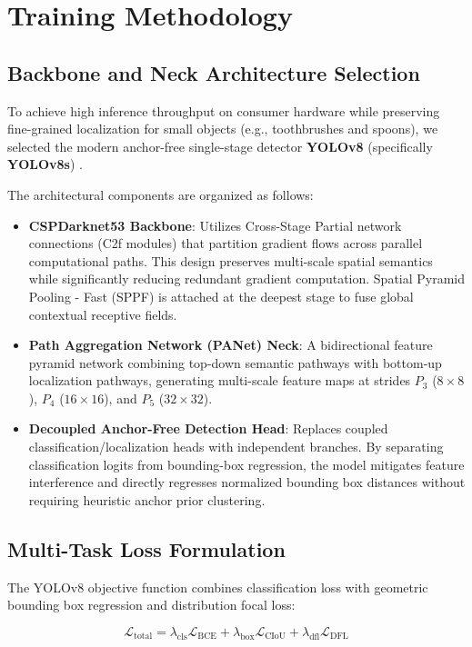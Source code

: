 \section{Training Methodology}
\label{sec:training_methodology}

\subsection{Backbone and Neck Architecture Selection}
To achieve high inference throughput on consumer hardware while preserving fine-grained localization for small objects (e.g., toothbrushes and spoons), we selected the modern anchor-free single-stage detector \textbf{YOLOv8} (specifically \textbf{YOLOv8s}) \cite{jocher2023ultralytics}.

The architectural components are organized as follows:
\begin{itemize}
    \item \textbf{CSPDarknet53 Backbone}: Utilizes Cross-Stage Partial network connections (C2f modules) \cite{wang2020cspnet} that partition gradient flows across parallel computational paths. This design preserves multi-scale spatial semantics while significantly reducing redundant gradient computation. Spatial Pyramid Pooling - Fast (SPPF) is attached at the deepest stage to fuse global contextual receptive fields.
    \item \textbf{Path Aggregation Network (PANet) Neck}: A bidirectional feature pyramid network \cite{liu2018path} combining top-down semantic pathways with bottom-up localization pathways, generating multi-scale feature maps at strides $P_3$ ($8\times8$), $P_4$ ($16\times16$), and $P_5$ ($32\times32$).
    \item \textbf{Decoupled Anchor-Free Detection Head}: Replaces coupled classification/localization heads with independent branches. By separating classification logits from bounding-box regression, the model mitigates feature interference and directly regresses normalized bounding box distances without requiring heuristic anchor prior clustering.
\end{itemize}

\subsection{Multi-Task Loss Formulation}
The YOLOv8 objective function combines classification loss with geometric bounding box regression and distribution focal loss:

\begin{equation}
    \mathcal{L}_{\text{total}} = \lambda_{\text{cls}} \mathcal{L}_{\text{BCE}} + \lambda_{\text{box}} \mathcal{L}_{\text{CIoU}} + \lambda_{\text{dfl}} \mathcal{L}_{\text{DFL}}
    \label{eq:yolo_total_loss}
\end{equation}

